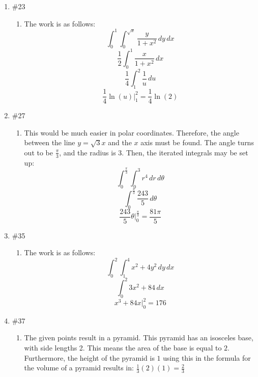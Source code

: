 \documentclass[12pt]{article}
\begin{document}
\begin{enumerate}
\begin{enumerate}
        \end{enumerate}

    \item \#23 \begin{enumerate}

        \item The work is as follows:
          $$\int_0^1\int_0^{\sqrt{x}} \frac{y}{1+x^2}\,dy\,dx$$
          $$\frac{1}{2}\int_0^1 \frac{x}{1+x^2}\,dx$$
          $$\frac{1}{4}\int_1^2 \frac{1}{u}\,du$$
          $$\frac{1}{4}\ln(u)\Big|_1^2=\frac{1}{4}\ln(2)$$


      \end{enumerate}

    \item \#27 \begin{enumerate}

        \item This would be much easier in polar coordinates. Therefore, the angle between the line $y=\sqrt{3}x$ and the $x$ axis must be found. The angle turns out to be $\frac{\pi}{3}$, and the radius is 3. Then, the iterated integrals may be set up: 
          $$\int_0^{\frac{\pi}{3}}\int_0^3 r^4\,dr\,d\theta$$
          $$\int_0^{\frac{\pi}{3}} \frac{243}{5}\,d\theta$$
          $$\frac{243}{5}\theta\Big|_0^{\frac{\pi}{3}}=\frac{81\pi}{5}$$

      \end{enumerate}

    \item \#35 \begin{enumerate}

        \item The work is as follows:
          $$\int_0^2\int_1^4 x^2+4y^2\,dy\,dx$$
          $$\int_0^2 3x^2+84\,dx$$
          $$x^3+84x\Big|_0^2=176$$

      \end{enumerate}

    \item \#37 \begin{enumerate}

        \item The given points result in a pyramid. This pyramid has an isosceles base, with side lengths 2. This means the area of the base is equal to $2$. Furthermore, the height of the pyramid is $1$ using this in the formula for the volume of a pyramid results in: $\frac{1}{3}(2)(1)=\frac{2}{3}$  

      \end{enumerate}


\end{enumerate}
\end{document}
